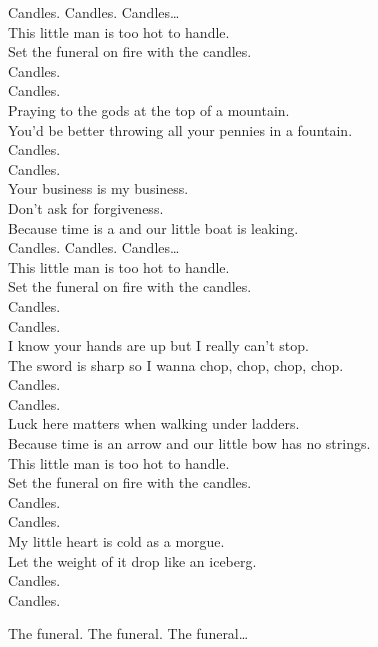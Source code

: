


Candles. Candles. Candles… \\

This little man is too hot to handle. \\
Set the funeral on fire with the candles. \\
Candles. \\
Candles. \\
Praying to the gods at the top of a mountain. \\
You'd be better throwing all your pennies in a fountain. \\
Candles. \\
Candles. \\

Your business is my business. \\
Don't ask for forgiveness. \\
Because time is a  and our little boat is leaking. \\

Candles. Candles. Candles… \\

This little man is too hot to handle. \\
Set the funeral on fire with the candles. \\
Candles. \\
Candles. \\
I know your hands are up but I really can't stop. \\
The sword is sharp so I wanna chop, chop, chop, chop. \\
Candles. \\
Candles. \\

Luck here matters when walking under ladders. \\
Because time is an arrow and our little bow has no strings. \\

This little man is too hot to handle. \\
Set the funeral on fire with the candles. \\
Candles. \\
Candles. \\
My little heart is cold as a morgue. \\
Let the weight of it drop like an iceberg. \\
Candles. \\
Candles. \\




The funeral. The funeral. The funeral… \\
